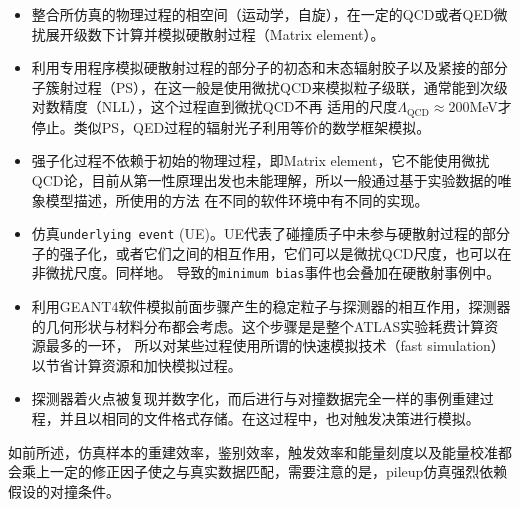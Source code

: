 \begin{itemize}
  \item 整合所仿真的物理过程的相空间（运动学，自旋），在一定的QCD或者QED微扰展开级数下计算并模拟硬散射过程（Matrix element）。
  \item 利用专用程序模拟硬散射过程的部分子的初态和末态辐射胶子以及紧接的部分子簇射过程（PS），在这一般是使用微扰QCD来模拟粒子级联，通常能到次级对数精度（NLL），这个过程直到微扰QCD不再
  适用的尺度$\Lambda_{\text{QCD}}\approx200$MeV才停止。类似PS，QED过程的辐射光子利用等价的数学框架模拟。
  \item 强子化过程不依赖于初始的物理过程，即Matrix element，它不能使用微扰QCD论，目前从第一性原理出发也未能理解，所以一般通过基于实验数据的唯象模型描述，所使用的方法
      在不同的软件环境中有不同的实现。
   \item 仿真\texttt{underlying event} (UE)。UE代表了碰撞质子中未参与硬散射过程的部分子的强子化，或者它们之间的相互作用，它们可以是微扰QCD尺度，也可以在非微扰尺度。同样地。
   导致\pileup 的\texttt{minimum bias}事件也会叠加在硬散射事例中。
   \item 利用GEANT4软件\cite{AGOSTINELLI2003250}模拟前面步骤产生的稳定粒子与探测器的相互作用，探测器的几何形状与材料分布都会考虑\cite{Aad2010-atlas-simu}。这个步骤是是整个ATLAS实验耗费计算资源最多的一环，
     所以对某些过程使用所谓的快速模拟技术（fast simulation）\cite{Lukas:2012kua}以节省计算资源和加快模拟过程。
    \item 探测器着火点被复现并数字化，而后进行与对撞数据完全一样的事例重建过程，并且以相同的文件格式存储。在这过程中，也对触发决策进行模拟。
 \end{itemize}

 如前所述，仿真样本的重建效率，鉴别效率，触发效率和能量刻度以及能量校准都会乘上一定的修正因子使之与真实数据匹配，需要注意的是，pileup仿真强烈依赖假设的对撞条件。
